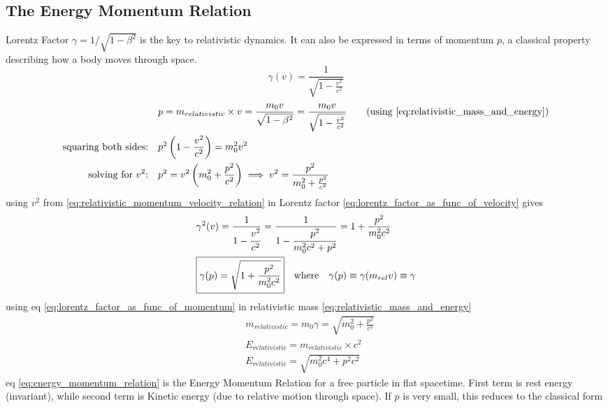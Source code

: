 \documentclass[11pt, a4paper]{article}
\newcommand{\eqrefnp}[1]{\textup{\ref{#1}}}  %
\begin{document}
	\subsection{The Energy Momentum Relation}
	Lorentz Factor $\gamma = 1/\sqrt{1 - \beta^{2}}$ is  the key to relativistic dynamics. It can also be expressed in terms of momentum $p$, a classical property describing how a body moves through space. \cite{forshaw2014relativity}
	\begin{equation}\label{eq:lorentz_factor_as_func_of_velocity}
		\gamma(v) = \frac{1}{\sqrt{1 - \frac{v^{2}}{c^{2}}}}
	\end{equation}
	\begin{align}
		& p = m_{relativistic} \times v = \frac{m_{0}v}{\sqrt{1 - \beta^{2}}} = \frac{m_{0}v}{\sqrt{1 - \frac{v^{2}}{c^{2}}}} \nonumber \tag{using \eqrefnp{eq:relativistic_mass_and_energy}} \\
		\text{squaring both sides:} \quad & p^{2}\left(1 - \frac{v^{2}}{c^{2}} \right) = m_{0}^{2}v^{2} \nonumber \\
		\text{solving for $v^{2}$:} \quad & p^{2} = v^{2} \left(m_{0}^{2} + \frac{p^{2}}{c^{2}}\right) \implies v^{2} = \frac{p^{2}}{m_{0}^{2} + \frac{p^{2}}{c^{2}}} \label{eq:relativistic_momentum_velocity_relation}
	\end{align}
	using $v^{2}$ from \eqref{eq:relativistic_momentum_velocity_relation} in Lorentz factor \eqref{eq:lorentz_factor_as_func_of_velocity} gives
	\begin{align}
		& \gamma^{2}(v) = \frac{1}{1 - \cfrac{v^{2}}{c^{2}}} = \frac{1}{1 - \cfrac{p^{2}}{m_{0}^{2}c^{2} + p^{2}}} = 1 + \frac{p^{2}}{m_{0}^{2}c^{2}} \nonumber  \\
		& \boxed{\gamma(p) = \sqrt{1 + \frac{p^{2}}{m_{0}^{2}c^{2}}}} \quad \text{where} \quad \gamma(p) \equiv \gamma(m_{rel}v) \equiv \gamma \label{eq:lorentz_factor_as_func_of_momentum}
	\end{align}
	using eq \eqref{eq:lorentz_factor_as_func_of_momentum} in relativistic mass \eqref{eq:relativistic_mass_and_energy}
	\begin{align}
		& m_{relativistic} = m_{0} \gamma = \sqrt{m_{0}^{2} + \frac{p^{2}}{c^{2}}} \nonumber \\
		& E_{relativistic} = m_{relativistic} \times c^{2}\nonumber \\
		& \boxed{E_{relativistic} = \sqrt{m_{0}^{2}c^{4} + p^{2}c^{2}}} \label{eq:energy_momentum_relation}
	\end{align}
	eq \eqref{eq:energy_momentum_relation} is the Energy Momentum Relation for a free particle in flat spacetime. First term is rest energy (invariant), while second term is Kinetic energy (due to relative motion through space). If $p$ is very small, this reduces to the classical form
\end{document}

